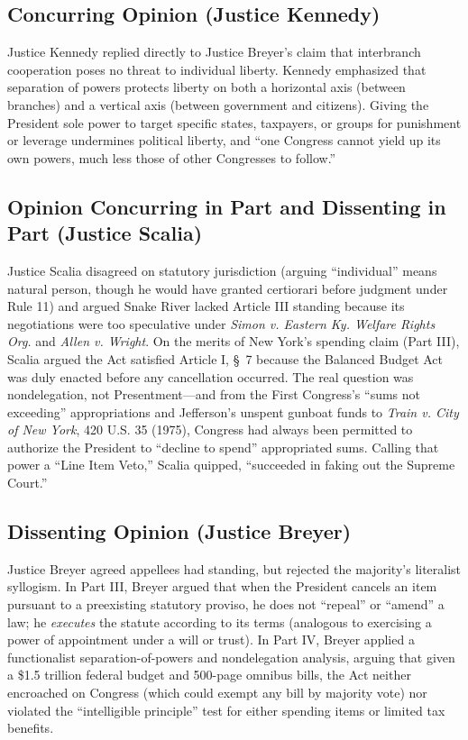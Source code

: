 \documentclass[12pt]{article}
\begin{document}
\subsection{Concurring Opinion (Justice Kennedy)}

Justice Kennedy replied directly to Justice Breyer's claim that interbranch cooperation poses no threat to individual liberty. Kennedy emphasized that separation of powers protects liberty on both a horizontal axis (between branches) and a vertical axis (between government and citizens). Giving the President sole power to target specific states, taxpayers, or groups for punishment or leverage undermines political liberty, and ``one Congress cannot yield up its own powers, much less those of other Congresses to follow.''

\subsection{Opinion Concurring in Part and Dissenting in Part (Justice Scalia)}

Justice Scalia disagreed on statutory jurisdiction (arguing ``individual'' means natural person, though he would have granted certiorari before judgment under Rule 11) and argued Snake River lacked Article III standing because its negotiations were too speculative under \textit{Simon v. Eastern Ky. Welfare Rights Org.} and \textit{Allen v. Wright}. On the merits of New York's spending claim (Part III), Scalia argued the Act satisfied Article I, \S~7 because the Balanced Budget Act was duly enacted before any cancellation occurred. The real question was nondelegation, not Presentment---and from the First Congress's ``sums not exceeding'' appropriations and Jefferson's unspent gunboat funds to \textit{Train v. City of New York}, 420 U.S. 35 (1975), Congress had always been permitted to authorize the President to ``decline to spend'' appropriated sums. Calling that power a ``Line Item Veto,'' Scalia quipped, ``succeeded in faking out the Supreme Court.''

\subsection{Dissenting Opinion (Justice Breyer)}

Justice Breyer agreed appellees had standing, but rejected the majority's literalist syllogism. In Part III, Breyer argued that when the President cancels an item pursuant to a preexisting statutory proviso, he does not ``repeal'' or ``amend'' a law; he \emph{executes} the statute according to its terms (analogous to exercising a power of appointment under a will or trust). In Part IV, Breyer applied a functionalist separation-of-powers and nondelegation analysis, arguing that given a \$1.5 trillion federal budget and 500-page omnibus bills, the Act neither encroached on Congress (which could exempt any bill by majority vote) nor violated the ``intelligible principle'' test for either spending items or limited tax benefits.
\end{document}
